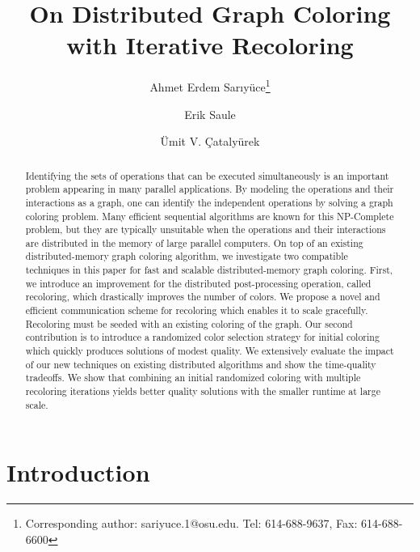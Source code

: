\documentclass{article}
\begin{document}
\title{On Distributed Graph Coloring with Iterative Recoloring}

\author[1,2]{Ahmet Erdem Sar{\i}y\"uce\footnote{Corresponding author: sariyuce.1@osu.edu. Tel: 614-688-9637, Fax: 614-688-6600}}
\author[4]{Erik Saule}
\author[1,3]{\"Umit V. \c{C}ataly\"urek}

\maketitle

\begin{abstract}
  Identifying the sets of operations that can be executed simultaneously
  is an important problem appearing in many parallel applications.  By
  modeling the operations and their interactions as a graph, one can
  identify the independent operations by solving a graph coloring
  problem. Many efficient sequential algorithms are known for this
  NP-Complete problem, but they are typically unsuitable when the
  operations and their interactions are distributed in the memory of
  large parallel computers. On top of an existing
  distributed-memory graph coloring algorithm, we investigate two
  compatible techniques in this paper for fast and scalable distributed-memory
  graph coloring. First, we introduce an improvement for the
  distributed post-processing operation, called recoloring, which
  drastically improves the number of colors. We propose a novel and efficient
  communication scheme for recoloring which enables it to scale
  gracefully. Recoloring must be seeded with an existing coloring of
  the graph. Our second
  contribution is to introduce a randomized color selection strategy for initial
  coloring which quickly produces solutions of modest quality. We extensively evaluate the
  impact of our new techniques on existing distributed algorithms and show
  the time-quality tradeoffs. We show that combining an initial
  randomized coloring with multiple recoloring iterations yields
  better quality solutions with the smaller runtime at large scale.
\end{abstract}



\section{Introduction}
\end{document}
